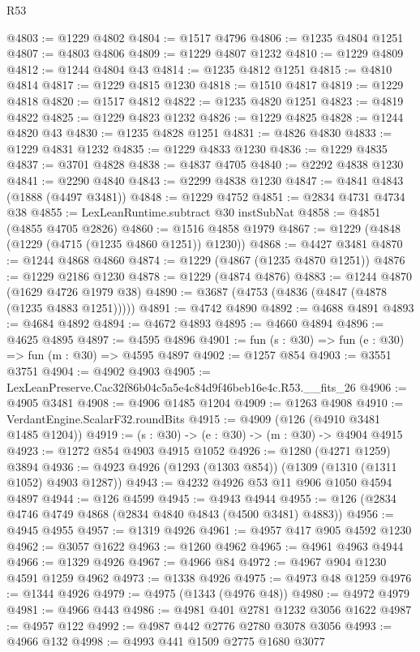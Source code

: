 \begin{lexlean}{R53}
\begin{coremodule}
@4803 := @1229 @4802
@4804 := @1517 @4796
@4806 := @1235 @4804 @1251
@4807 := @4803 @4806
@4809 := @1229 @4807 @1232
@4810 := @1229 @4809
@4812 := @1244 @4804 @43
@4814 := @1235 @4812 @1251
@4815 := @4810 @4814
@4817 := @1229 @4815 @1230
@4818 := @1510 @4817
@4819 := @1229 @4818
@4820 := @1517 @4812
@4822 := @1235 @4820 @1251
@4823 := @4819 @4822
@4825 := @1229 @4823 @1232
@4826 := @1229 @4825
@4828 := @1244 @4820 @43
@4830 := @1235 @4828 @1251
@4831 := @4826 @4830
@4833 := @1229 @4831 @1232
@4835 := @1229 @4833 @1230
@4836 := @1229 @4835
@4837 := @3701 @4828
@4838 := @4837 @4705
@4840 := @2292 @4838 @1230
@4841 := @2290 @4840
@4843 := @2299 @4838 @1230
@4847 := @4841 @4843 (@1888 (@4497 @3481))
@4848 := @1229 @4752
@4851 := @2834 @4731 @4734 @38
@4855 := LexLeanRuntime.subtract @30 instSubNat
@4858 := @4851 (@4855 @4705 @2826)
@4860 := @1516 @4858 @1979
@4867 := @1229 (@4848 (@1229 (@4715 (@1235 @4860 @1251)) @1230))
@4868 := @4427 @3481
@4870 := @1244 @4868 @4860
@4874 := @1229 (@4867 (@1235 @4870 @1251))
@4876 := @1229 @2186 @1230
@4878 := @1229 (@4874 @4876)
@4883 := @1244 @4870 (@1629 @4726 @1979 @38)
@4890 := @3687 (@4753 (@4836 (@4847 (@4878 (@1235 @4883 @1251)))))
@4891 := @4742 @4890
@4892 := @4688 @4891
@4893 := @4684 @4892
@4894 := @4672 @4893
@4895 := @4660 @4894
@4896 := @4625 @4895
@4897 := @4595 @4896
@4901 := fun (s : @30) => fun (e : @30) => fun (m : @30) => @4595 @4897
@4902 := @1257 @854
@4903 := @3551 @3751
@4904 := @4902 @4903
@4905 := LexLeanPreserve.Cac32f86b04c5a5e4c84d9f46beb16e4c.R53.__fits_26
@4906 := @4905 @3481
@4908 := @4906 @1485 @1204
@4909 := @1263 @4908
@4910 := VerdantEngine.ScalarF32.roundBits
@4915 := @4909 (@126 (@4910 @3481 @1485 @1204))
@4919 := (s : @30) -> (e : @30) -> (m : @30) -> @4904 @4915
@4923 := @1272 @854 @4903 @4915 @1052
@4926 := @1280 (@4271 @1259) @3894
@4936 := @4923 @4926 (@1293 (@1303 @854)) (@1309 (@1310 (@1311 @1052) @4903 @1287))
@4943 := @4232 @4926 @53 @11 @906 @1050 @4594 @4897
@4944 := @126 @4599
@4945 := @4943 @4944
@4955 := @126 (@2834 @4746 @4749 @4868 (@2834 @4840 @4843 (@4500 @3481) @4883))
@4956 := @4945 @4955
@4957 := @1319 @4926
@4961 := @4957 @417 @905 @4592 @1230
@4962 := @3057 @1622
@4963 := @1260 @4962
@4965 := @4961 @4963 @4944
@4966 := @1329 @4926
@4967 := @4966 @84
@4972 := @4967 @904 @1230 @4591 @1259 @4962
@4973 := @1338 @4926
@4975 := @4973 @48 @1259
@4976 := @1344 @4926
@4979 := @4975 (@1343 (@4976 @48))
@4980 := @4972 @4979
@4981 := @4966 @443
@4986 := @4981 @401 @2781 @1232 @3056 @1622
@4987 := @4957 @122
@4992 := @4987 @442 @2776 @2780 @3078 @3056
@4993 := @4966 @132
@4998 := @4993 @441 @1509 @2775 @1680 @3077

\end{coremodule}
\end{lexlean}
